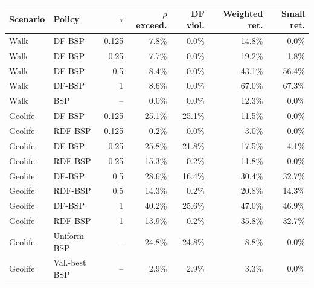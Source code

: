 \begin{tabular}{llrrrrr}
\toprule
Scenario & Policy & $\tau$ & $\rho$ exceed. & DF viol. & Weighted ret. & Small ret. \\
\midrule
Walk & DF-BSP & 0.125 & 7.8\% & 0.0\% & 14.8\% & 0.0\% \\
Walk & DF-BSP & 0.25 & 7.7\% & 0.0\% & 19.2\% & 1.8\% \\
Walk & DF-BSP & 0.5 & 8.4\% & 0.0\% & 43.1\% & 56.4\% \\
Walk & DF-BSP & 1 & 8.6\% & 0.0\% & 67.0\% & 67.3\% \\
Walk & BSP & -- & 0.0\% & 0.0\% & 12.3\% & 0.0\% \\
\addlinespace
Geolife & DF-BSP & 0.125 & 25.1\% & 25.1\% & 11.5\% & 0.0\% \\
Geolife & RDF-BSP & 0.125 & 0.2\% & 0.0\% & 3.0\% & 0.0\% \\
Geolife & DF-BSP & 0.25 & 25.8\% & 21.8\% & 17.5\% & 4.1\% \\
Geolife & RDF-BSP & 0.25 & 15.3\% & 0.2\% & 11.8\% & 0.0\% \\
Geolife & DF-BSP & 0.5 & 28.6\% & 16.4\% & 30.4\% & 32.7\% \\
Geolife & RDF-BSP & 0.5 & 14.3\% & 0.2\% & 20.8\% & 14.3\% \\
Geolife & DF-BSP & 1 & 40.2\% & 25.6\% & 47.0\% & 46.9\% \\
Geolife & RDF-BSP & 1 & 13.9\% & 0.2\% & 35.8\% & 32.7\% \\
Geolife & Uniform BSP & -- & 24.8\% & 24.8\% & 8.8\% & 0.0\% \\
Geolife & Val.-best BSP & -- & 2.9\% & 2.9\% & 3.3\% & 0.0\% \\
\bottomrule
\end{tabular}
